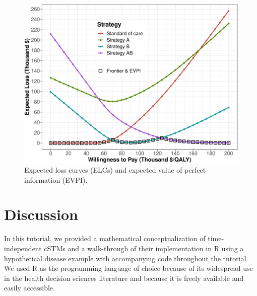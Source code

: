 \documentclass[
]{article}
\begin{document}
\begin{figure}[H]

{\centering \includegraphics{figs/ELC-1} 

}

\caption{Expected loss curves (ELCs) and expected value of perfect information (EVPI).}\label{fig:ELC}
\end{figure}

\hypertarget{discussion}{%
\section{Discussion}\label{discussion}}

In this tutorial, we provided a mathematical conceptualization of time-independent cSTMs and a walk-through of their implementation in R using a hypothetical disease example with accompanying code throughout the tutorial. We used R as the programming language of choice because of its widespread use in the health decision sciences literature and because it is freely available and easily accessible.
\end{document}

